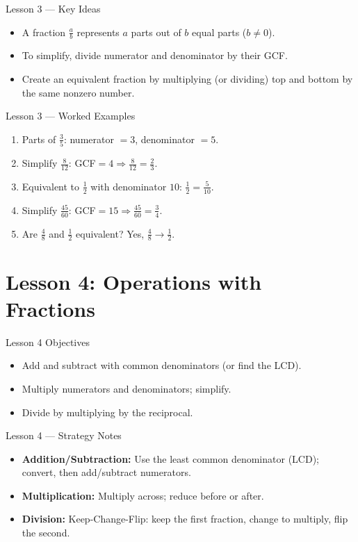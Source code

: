\documentclass[aspectratio=169]{beamer}
\begin{document}
\begin{frame}{Lesson 3 --- Key Ideas}
\begin{itemize}
  \item A fraction $\frac{a}{b}$ represents $a$ parts out of $b$ equal parts ($b\neq 0$).
  \item To simplify, divide numerator and denominator by their GCF.
  \item Create an equivalent fraction by multiplying (or dividing) top and bottom by the same nonzero number.
\end{itemize}
\end{frame}

\begin{frame}{Lesson 3 --- Worked Examples}
\begin{enumerate}
  \item Parts of $\frac{3}{5}$: numerator $=3$, denominator $=5$.
  \item Simplify $\frac{8}{12}$: GCF$=4 \Rightarrow \frac{8}{12}=\frac{2}{3}$.
  \item Equivalent to $\frac{1}{2}$ with denominator $10$: $\frac{1}{2}=\frac{5}{10}$.
  \item Simplify $\frac{45}{60}$: GCF$=15 \Rightarrow \frac{45}{60}=\frac{3}{4}$.
  \item Are $\frac{4}{8}$ and $\frac{1}{2}$ equivalent? Yes, $\frac{4}{8}\to\frac{1}{2}$.
\end{enumerate}
\end{frame}

\section{Lesson 4: Operations with Fractions}
\begin{frame}{Lesson 4 Objectives}
\begin{itemize}
  \item Add and subtract with common denominators (or find the LCD).
  \item Multiply numerators and denominators; simplify.
  \item Divide by multiplying by the reciprocal.
\end{itemize}
\end{frame}

\begin{frame}{Lesson 4 --- Strategy Notes}
\begin{itemize}
  \item \textbf{Addition/Subtraction:} Use the least common denominator (LCD); convert, then add/subtract numerators.
  \item \textbf{Multiplication:} Multiply across; reduce before or after.
  \item \textbf{Division:} Keep-Change-Flip: keep the first fraction, change to multiply, flip the second.
\end{itemize}
\end{frame}
\end{document}
